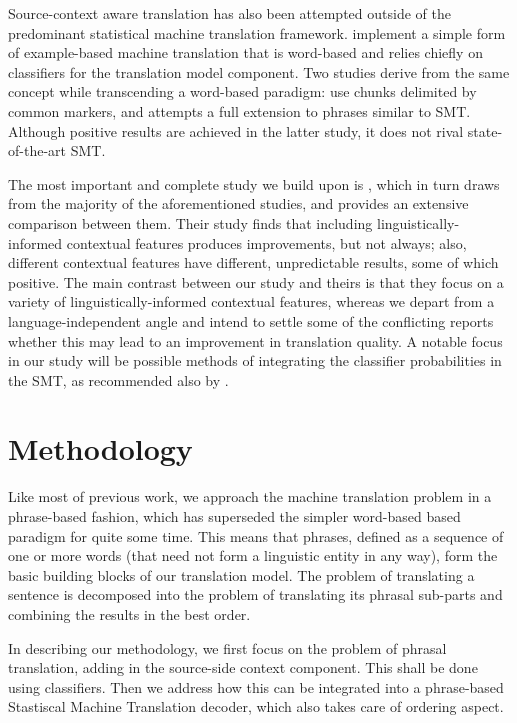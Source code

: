 \documentclass[smallextended]{svjour3}       %
\theoremstyle{break}
\begin{document}
Source-context aware translation has also been attempted outside of the
predominant statistical machine translation framework. \cite{MBMT} implement a
simple form of example-based machine translation that is word-based and relies
chiefly on classifiers for the translation model component. Two studies derive
from the same concept while transcending a word-based paradigm:
\cite{MARKERBASED} use chunks delimited by common markers, and \cite{PBMBMT}
attempts a full extension to phrases similar to SMT. Although positive results
are achieved in the latter study, it does not rival state-of-the-art SMT.

The most important and complete study we build upon is
\cite{Rejwanul+11}, which in turn draws from the majority of the
aforementioned studies, and provides an extensive comparison between
them. Their study finds that including linguistically-informed
contextual features produces improvements, but not always; also,
different contextual features have different, unpredictable results,
some of which positive. The main contrast between our study and
theirs is that they focus on a variety of linguistically-informed
contextual features, whereas we depart from a language-independent
angle and intend to settle some of the conflicting reports whether
this may lead to an improvement in translation quality. A notable
focus in our study will be possible methods of integrating the
classifier probabilities in the SMT, as recommended also by
\cite{Gimenez+07}.


\section{Methodology}
\label{ref:methodology}

Like most of previous work, we approach the machine translation
problem in a phrase-based fashion, which has superseded the simpler word-based
based paradigm for quite some time. This means that phrases, defined as a
sequence of one or more words (that need not form a linguistic entity in any
way), form the basic building blocks of our translation model. The problem of
translating a sentence is decomposed into the problem of translating its phrasal
sub-parts and combining the results in the best order.

In describing our methodology, we first focus on the problem of phrasal
translation, adding in the source-side context component. This shall be done
using classifiers. Then we address how this can be integrated into a
phrase-based Stastiscal Machine Translation decoder, which also takes care of
ordering aspect. 
\end{document}
